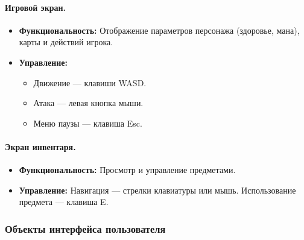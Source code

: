 \documentclass{article}
\begin{document}
	\paragraph{Игровой экран.}
	\begin{itemize}
		\item \textbf{Функциональность:} Отображение параметров персонажа (здоровье, мана), карты и действий игрока.
		\item \textbf{Управление:} 
		\begin{itemize}
			\item Движение — клавиши WASD.
			\item Атака — левая кнопка мыши.
			\item Меню паузы — клавиша Esc.
		\end{itemize}
	\end{itemize}
	
	\paragraph{Экран инвентаря.}
	\begin{itemize}
		\item \textbf{Функциональность:} Просмотр и управление предметами.
		\item \textbf{Управление:} Навигация — стрелки клавиатуры или мышь. Использование предмета — клавиша E.
	\end{itemize}
	
	
	\subsubsection{Объекты интерфейса пользователя}
	
\end{document}
